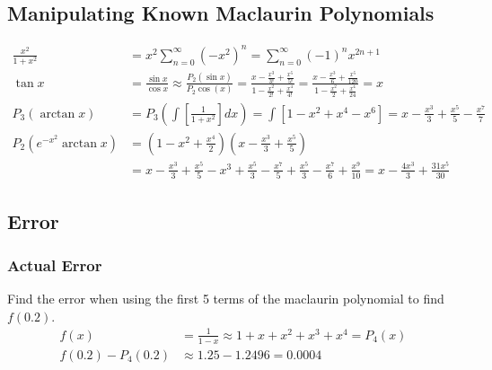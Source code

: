 \documentclass[12pt, A4]{article}
\begin{document}
		\subsection{Manipulating Known Maclaurin Polynomials}
			\begin{align*}
				\frac{x^2}{1 + x^2} &= x^2\sum_{n = 0}^\infty\left(-x^2\right)^n = \sum_{n = 0}^\infty\left(-1\right)^nx^{2n + 1} \\
				\tan x &= \frac{\sin x}{\cos x} \approx \frac{P_2(\sin x)}{P_2\cos(x)} = \frac{x - \frac{x^3}{3!} + \frac{x^5}{5!}}{1 - \frac{x^2}{2!} + \frac{x^4}{4!}} = \frac{x - \frac{x^3}{6} + \frac{x^5}{120}}{1 - \frac{x^2}{2} + \frac{x^4}{24}} = x \\
				P_3(\arctan x) &= P_3\left(\int\left[\frac{1}{1 + x^2}\right]dx\right) = \int\left[1 - x^2 + x^4 - x^6\right] = x - \frac{x^3}{3} + \frac{x^5}{5} - \frac{x^7}{7} \\
				P_2\left(e^{-x^2}\arctan{x}\right) &= \left(1 - x^2 + \frac{x^4}{2}\right)\left(x - \frac{x^3}{3} + \frac{x^5}{5}\right) \\
					&= x - \frac{x^3}{3} + \frac{x^5}{5} - x^3 + \frac{x^5}{3} - \frac{x^7}{5} + \frac{x^5}{3} - \frac{x^7}{6} + \frac{x^9}{10} = x - \frac{4x^3}{3} + \frac{31x^5}{30}
			\end{align*}
		\subsection{Error}
			\subsubsection*{Actual Error} 
				Find the error when using the first 5 terms of the maclaurin polynomial to find $f(0.2)$.
				\begin{align*}
					f(x) &= \frac{1}{1 - x} \approx 1 + x + x^2 + x^3 + x^4 = P_4(x)\\
					f(0.2) - P_4(0.2)  &\approx 1.25 - 1.2496 = 0.0004
				\end{align*}
\end{document}

